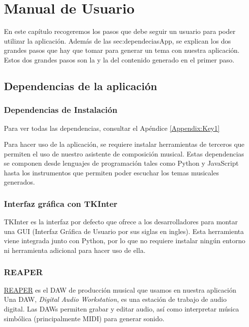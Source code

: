 \chapter{Manual de Usuario}
\label{cap:descripcionTrabajo}

En este capítulo recogeremos los pasos que debe seguir un usuario para poder utilizar la aplicación. Además de las \refname{sec:dependeciasApp}, se explican los dos grandes pasos que hay que tomar para generar un tema con nuestra aplicación. 
Estos dos grandes pasos son la  y la  del contenido generado en el primer paso. 

\section{Dependencias de la aplicación}
\label{sec:dependeciasApp}
\subsection{Dependencias de Instalación}
	Para ver todas las dependencias, consultar el Apéndice \ref{Appendix:Key1}

	Para hacer uso de la aplicación, se requiere instalar herramientas de terceros que permiten el uso de nuestro asistente de composición musical.
	Estas dependencias se componen desde lenguajes de programación tales como Python y JavaScript hasta los instrumentos que permiten poder escuchar los temas musicales generados.

\subsection{Interfaz gráfica con TKInter}
	TKInter es la interfaz por defecto que \PythonLink{} ofrece a los desarrolladores para montar una 
    GUI (Interfaz Gráfica de Usuario por sus siglas en ingles).
	Esta herramienta viene integrada junto con Python, por lo que no requiere instalar ningún entorno ni herramienta adicional para hacer uso de ella.



\subsection{REAPER}
\label{subsec:reaper}
	\href{https://www.reaper.fm/}{REAPER} es el DAW de producción musical que usamos en nuestra aplicación
	Una DAW, \textit{Digital Audio Workstation}, es una estación de trabajo de audio digital. Las DAWs permiten grabar y editar audio, así como interpretar música simbólica (principalmente MIDI) para generar sonido.

